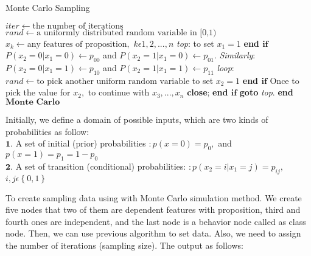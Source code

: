 \documentclass[a4,12pt]{ozu-thesis}
\begin{document}
\begin{algorithm}
\caption{Monte Carlo Sampling}\label{euclid}
\begin{algorithmic}[1]
\State $iter \gets \text{the number of iterations}$
\State $rand \gets \text{a uniformly distributed random variable in [0,1)}$
\State $\mathit{x_{k}} \gets \text{any features of proposition},$ $\mathit{k \epsilon 1,2,..., n }$
\BState \emph{top}:
\State to set $\mathit{x_{1} = 1}$
\EndIf
\State \textbf{end ${\textbf{if}}$ }
\State $P\left ( x_{2} = 0 | x_{1} = 0 \right ) \gets  p_{00}$ and $P\left ( x_{2} = 1 | x_{1} = 0 \right )  \gets  p_{01}$.
\BState \emph{ Similarly}:
\State $P\left ( x_{2} = 0 | x_{1} = 1 \right ) \gets  p_{10}$ and $P\left ( x_{2} = 1 | x_{1} = 1 \right )  \gets  p_{11}$
\BState \emph{loop}:
\State $rand \gets \text{to pick another uniform random variable}$
\State to set $\mathit{x_{2} = 1}$
\EndIf
\State \textbf{end ${\textbf{if}}$ }
\State Once to pick the value for  $ \mathit{x_{2}},$ to continue with $ \mathit{x_{3}}, ... , \mathit{x_{n}}$
\State \textbf{close};
\EndIf
\State \textbf{end ${\textbf{if}}$ }
\State \textbf{goto} \emph{top}.
\State \textbf{end ${\textbf{Monte Carlo}}$ }
\EndProcedure
\end{algorithmic}
\end{algorithm}

  Initially, we define a domain of possible inputs, which are two kinds of probabilities as follow: 
\\ $\mathbf{1.}$ A set of initial (prior) probabilities $: p\left ( x = 0 \right ) = p_{0},$ and $ p\left ( x = 1 \right ) = p_{1} = 1 - p_{0}$
\\ $\mathbf{2.}$ A set of transition (conditional) probabilities: $: p\left ( x_{2} = i | x_{1} = j\right ) = p_{ij} , $ $ i,j\epsilon \left \{ 0, 1 \right \}$
 
  To create sampling data using with Monte Carlo simulation method. We create five nodes that two of them are dependent features with proposition, third and fourth ones are independent, and the last node is a behavior node called as class node. Then, we can use previous algorithm to set data. Also, we need to assign the number of iterations (sampling size). The output as follows:
\end{document}
